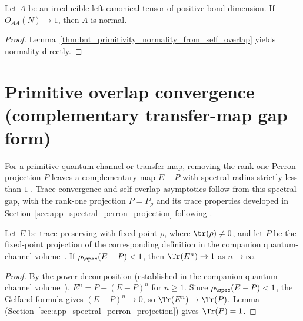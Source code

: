\begin{lemma}
    \label{thm:bnt_normality_from_self_overlap}
    \leanok
    Let $A$ be an irreducible left-canonical tensor of positive bond dimension.
    If $O_{AA}(N)\to1$, then $A$ is normal.
\end{lemma}

\begin{proof}
    \leanok
    Lemma~\ref{thm:bnt_primitivity_normality_from_self_overlap} yields
    normality directly.
\end{proof}

\section{Primitive overlap convergence (complementary transfer-map gap form)}

For a primitive quantum channel or transfer map, removing the rank-one Perron
projection $P$ leaves a complementary map $E-P$ with spectral radius strictly
less than $1$ \cite[Theorem~6.7]{Wolf2012Quantum}. Trace convergence and
self-overlap asymptotics follow from this spectral gap, with the rank-one
projection $P=P_\rho$ and its trace properties developed in
Section~\ref{sec:app_spectral_perron_projection} following
\cite[``Complementary transfer-map gap for primitive maps'']{QICLean2026Blueprint}.

\begin{lemma}%
    \label{thm:trace_pow_one}
    \leanok
    Let $E$ be trace-preserving with fixed point $\rho$, where
    $\tr(\rho)\neq0$, and let $P$ be the fixed-point projection of
    the corresponding definition in the companion quantum-channel volume~\cite[``Fixed-point projection'']{QICLean2026Blueprint}. If
    $\rho_{\spec}(E-P)<1$, then $\Tr(E^n)\to1$ as $n\to\infty$.
\end{lemma}

\begin{proof}
    \leanok

    By the power decomposition (established in the companion quantum-channel volume~\cite[``Power decomposition'']{QICLean2026Blueprint}),
    $E^n=P+(E-P)^n$ for $n\geq1$. Since $\rho_{\spec}(E-P)<1$, the
    Gelfand formula gives $(E-P)^n\to0$, so
    $\Tr(E^n)\to\Tr(P)$. Lemma~\cite[``Trace of the fixed-point projection'']{QICLean2026Blueprint}
    (Section~\ref{sec:app_spectral_perron_projection}) gives $\Tr(P)=1$.
\end{proof}

